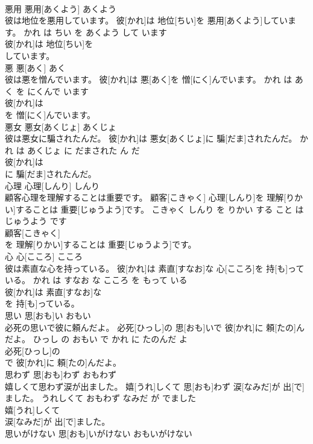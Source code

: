 \documentclass[8pt]{extreport}
\begin{document}
\begin{CJK}{UTF8}{min}
\\	悪用	悪用[あくよう]	あくよう	
\\	彼は地位を悪用しています。	彼[かれ]は 地位[ちい]を 悪用[あくよう]しています。	かれ は ちい を あくよう して います	
\\	彼[かれ]は 地位[ちい]を
\\	しています。			
\\	悪	悪[あく]	あく	
\\	彼は悪を憎んでいます。	彼[かれ]は 悪[あく]を 憎[にく]んでいます。	かれ は あく を にくんで います	
\\	彼[かれ]は
\\	を 憎[にく]んでいます。			
\\	悪女	悪女[あくじょ]	あくじょ	
\\	彼は悪女に騙されたんだ。	彼[かれ]は 悪女[あくじょ]に 騙[だま]されたんだ。	かれ は あくじょ に だまされた ん だ	
\\	彼[かれ]は
\\	に 騙[だま]されたんだ。			
\\	心理	心理[しんり]	しんり	
\\	顧客心理を理解することは重要です。	顧客[こきゃく] 心理[しんり]を 理解[りかい]することは 重要[じゅうよう]です。	こきゃく しんり を りかい する こと は じゅうよう です	
\\	顧客[こきゃく]
\\	を 理解[りかい]することは 重要[じゅうよう]です。			
\\	心	心[こころ]	こころ	
\\	彼は素直な心を持っている。	彼[かれ]は 素直[すなお]な 心[こころ]を 持[も]っている。	かれ は すなお な こころ を もって いる	
\\	彼[かれ]は 素直[すなお]な
\\	を 持[も]っている。			
\\	思い	思[おも]い	おもい	
\\	必死の思いで彼に頼んだよ。	必死[ひっし]の 思[おも]いで 彼[かれ]に 頼[たの]んだよ。	ひっし の おもい で かれ に たのんだ よ	
\\	必死[ひっし]の
\\	で 彼[かれ]に 頼[たの]んだよ。			
\\	思わず	思[おも]わず	おもわず	
\\	嬉しくて思わず涙が出ました。	嬉[うれ]しくて 思[おも]わず 涙[なみだ]が 出[で]ました。	うれしくて おもわず なみだ が でました	
\\	嬉[うれ]しくて
\\	涙[なみだ]が 出[で]ました。			
\\	思いがけない	思[おも]いがけない	おもいがけない	

\end{CJK}
\end{document}
